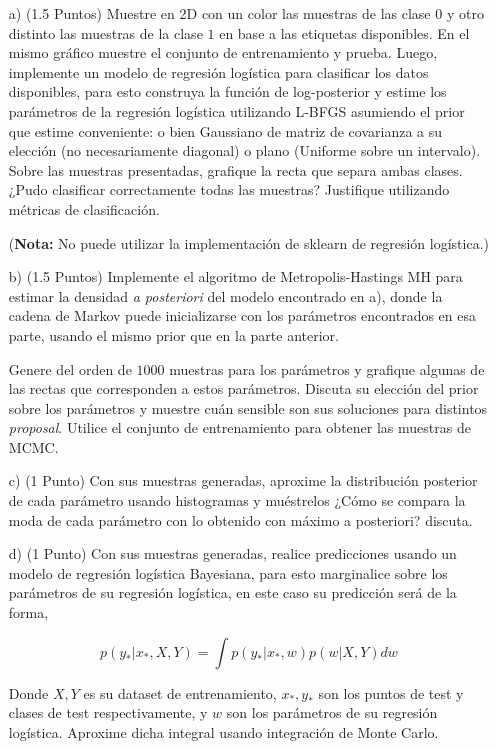 \documentclass[11pt,letterpaper]{article}
\begin{document}
\begin{enumerate}

\item[a)](1.5 Puntos) Muestre en 2D con un color las muestras de las clase $0$ y otro distinto las muestras de la clase $1$ en base a las etiquetas disponibles. En el mismo gráfico muestre el conjunto de entrenamiento y prueba. Luego, implemente un modelo de regresión logística para clasificar los datos disponibles, para esto construya la función de log-posterior y estime los parámetros de la regresión logística utilizando L-BFGS asumiendo el prior que estime conveniente: o bien Gaussiano de matriz de covarianza a su elección (no necesariamente diagonal) o plano (Uniforme sobre un intervalo). Sobre las muestras presentadas, grafique la recta que separa ambas clases. ¿Pudo clasificar correctamente todas las muestras? Justifique utilizando métricas de clasificación.

(\textbf{Nota:} No puede utilizar la implementación de sklearn de regresión logística.)

\item[b)](1.5 Puntos) Implemente el algoritmo de Metropolis-Hastings MH para estimar la densidad \textit{a posteriori} del modelo encontrado en a), donde la cadena de Markov puede inicializarse con los parámetros encontrados en esa parte, usando el mismo prior que en la parte anterior.

Genere del orden de $1000$ muestras para los parámetros y grafique algunas de las rectas que corresponden a estos parámetros. Discuta su elección del prior sobre los parámetros y muestre cuán sensible son sus soluciones para distintos \textit{proposal}. Utilice el conjunto de entrenamiento para obtener las muestras de MCMC.

\item[c)](1 Punto) Con sus muestras generadas, aproxime la distribución posterior de cada parámetro usando histogramas y muéstrelos ¿Cómo se compara la moda de cada parámetro con lo obtenido con máximo a posteriori? discuta.

\item[d)](1 Punto) Con sus muestras generadas, realice predicciones usando un modelo de regresión logística Bayesiana, para esto marginalice sobre los parámetros de su regresión logística, en este caso su predicción será de la forma,

$$p(y_*|x_*, X, Y) = \int p(y_*|x_*, w) p(w|X, Y) dw$$

Donde $X,Y$ es su dataset de entrenamiento, $x_*, y_*$ son los puntos de test y clases de test respectivamente, y $w$ son los parámetros de su regresión logística. Aproxime dicha integral usando integración de Monte Carlo.

\end{enumerate}
\end{document}
